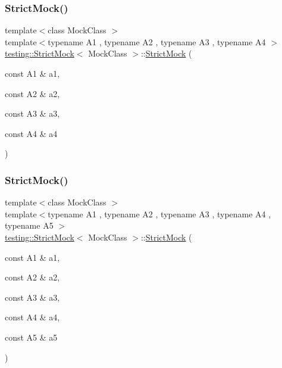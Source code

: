 \mbox{\label{classtesting_1_1_strict_mock_a6b42ef1460901ea91a2a09f44ae8fba2}} 
\subsubsection{\texorpdfstring{StrictMock()}{StrictMock()}\hspace{0.1cm}{\footnotesize\ttfamily [11/17]}}
{\footnotesize\ttfamily template$<$class Mock\+Class $>$ \\
template$<$typename A1 , typename A2 , typename A3 , typename A4 $>$ \\
\mbox{\hyperlink{classtesting_1_1_strict_mock}{testing\+::\+Strict\+Mock}}$<$ Mock\+Class $>$\+::\mbox{\hyperlink{classtesting_1_1_strict_mock}{Strict\+Mock}} (\begin{DoxyParamCaption}\item[{const A1 \&}]{a1,  }\item[{const A2 \&}]{a2,  }\item[{const A3 \&}]{a3,  }\item[{const A4 \&}]{a4 }\end{DoxyParamCaption})\hspace{0.3cm}{\ttfamily [inline]}}

\mbox{\label{classtesting_1_1_strict_mock_a2019f4e86224b2adbb9e9326bc175c50}} 
\subsubsection{\texorpdfstring{StrictMock()}{StrictMock()}\hspace{0.1cm}{\footnotesize\ttfamily [12/17]}}
{\footnotesize\ttfamily template$<$class Mock\+Class $>$ \\
template$<$typename A1 , typename A2 , typename A3 , typename A4 , typename A5 $>$ \\
\mbox{\hyperlink{classtesting_1_1_strict_mock}{testing\+::\+Strict\+Mock}}$<$ Mock\+Class $>$\+::\mbox{\hyperlink{classtesting_1_1_strict_mock}{Strict\+Mock}} (\begin{DoxyParamCaption}\item[{const A1 \&}]{a1,  }\item[{const A2 \&}]{a2,  }\item[{const A3 \&}]{a3,  }\item[{const A4 \&}]{a4,  }\item[{const A5 \&}]{a5 }\end{DoxyParamCaption})\hspace{0.3cm}{\ttfamily [inline]}}

